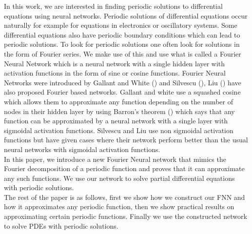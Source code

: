 \documentclass[11pt]{article}
\begin{document}
In this work, we are interested in finding periodic solutions to differential equations using neural networks. Periodic solutions of differential equations occur naturally for example for equations in electronics or oscillatory systems. Some differential equations also have periodic boundary conditions which can lead to periodic solutions. To look for periodic solutions one often look for solutions in the form of Fourier series. 
We make use of this and use what is called a Fourier Neural Network which is a neural network with a single hidden layer with activation functions in the form of sine or cosine functions. Fourier Neural Networks were introduced by Gallant and White (\cite{Gallant}) and Silvescu (\cite{Silvescu}), Liu (\cite{Liu}) have also proposed Fourier based networks. Gallant and white use a squashed cosine which allows them to approximate any function depending on the number of nodes in their hidden layer by using Barron's theorem (\cite{Barron}) which says that any function can be approximated by a neural network with a single layer with sigmoidal activation functions. Silvescu and Liu use non sigmoidal activation functions but have given cases where their network perform better than the usual neural networks with sigmoidal activation functions.\\

In this paper, we introduce a new Fourier Neural network that mimics the Fourier decomposition of a periodic function and proves that it can approximate any such functions. We use our network to solve partial differential equations with periodic solutions. \\

The rest of the paper is as follows, first we show how we construct our FNN and how it approximates any periodic function, then we show practical results on approximating certain periodic functions. Finally we use the constructed network to solve PDEs with periodic solutions.
\end{document}
